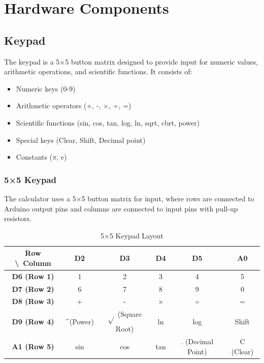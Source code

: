 \documentclass[12pt]{article}
\begin{document}
\section{Hardware Components}

\subsection{Keypad}
The keypad is a 5×5 button matrix designed to provide input for numeric values, arithmetic operations, and scientific functions. It consists of:
\begin{itemize}
    \item Numeric keys (0-9)
    \item Arithmetic operators (+, -, ×, ÷, =)
    \item Scientific functions (sin, cos, tan, log, ln, sqrt, cbrt, power)
    \item Special keys (Clear, Shift, Decimal point)
    \item Constants ($\pi$, e)
\end{itemize}

\subsubsection{5×5 Keypad}
The calculator uses a 5×5 button matrix for input, where rows are connected to Arduino output pins and columns are connected to input pins with pull-up resistors.

\begin{table}[H]
    \centering
    \begin{tabular}{|c|c|c|c|c|c|}
        \hline
        \textbf{Row \textbackslash\ Column} & \textbf{D2} & \textbf{D3} & \textbf{D4} & \textbf{D5} & \textbf{A0} \\  
        \hline
        \textbf{D6 (Row 1)}  & 1   & 2   & 3   & 4   & 5    \\  
        \hline
        \textbf{D7 (Row 2)}  & 6   & 7   & 8   & 9   & 0    \\  
        \hline
        \textbf{D8 (Row 3)}  & +   & -   & ×   & ÷   & =    \\  
        \hline
        \textbf{D9 (Row 4)}  & \textasciicircum (Power) & $\sqrt{}$ (Square Root) & ln  & log  & Shift  \\  
        \hline
        \textbf{A1 (Row 5)} & sin & cos & tan & . (Decimal Point) & C (Clear) \\  
        \hline
    \end{tabular}
    \caption{5×5 Keypad Layout}
    \label{tab:keypad_layout}
\end{table}
\end{document}
